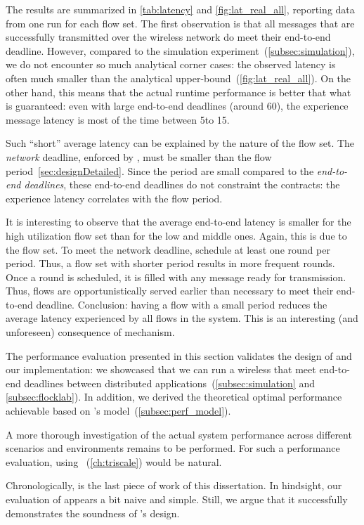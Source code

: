 The results are summarized in \cref{tab:latency} and \cref{fig:lat_real_all}, reporting data from one run for each flow set.
The first observation is that all messages that are successfully transmitted over the wireless network do meet their end-to-end deadline.
However, compared to the simulation experiment~(\cref{subsec:simulation}), we do not encounter so much analytical corner cases: the observed latency is often much smaller than the analytical upper-bound~(\cref{fig:lat_real_all}).
On the other hand, this means that the actual runtime performance is better that what is guaranteed: even with large end-to-end deadlines (around 60\s), the experience message latency is most of the time between 5\s to 15\s.

Such ``short'' average latency can be explained by the nature of the flow set. The \emph{network} deadline, enforced by \blink, must be smaller than the flow period~\cref{sec:designDetailed}. Since the period are small compared to the \emph{end-to-end deadlines}, these end-to-end deadlines do not constraint the \DRP contracts: the experience latency correlates with the flow period.

It is interesting to observe that the average end-to-end latency is smaller for the high utilization flow set than for the low and middle ones. Again, this is due to the flow set. To meet the network deadline, \blink schedule at least one round per period. Thus, a flow set with shorter period results in more frequent rounds. Once a round is scheduled, it is filled with any message ready for transmission. Thus, flows are opportunistically served earlier than necessary to meet their end-to-end deadline. Conclusion: having a flow with a small period reduces the average latency experienced by all flows in the system. This is an interesting (and unforeseen) consequence of \DRP mechanism.

The performance evaluation presented in this section validates the design of \DRP and our implementation: we showcased that we can run a wireless \CPS that meet end-to-end deadlines between distributed applications~(\cref{subsec:simulation} and \ref{subsec:flocklab}).
In addition, we derived the theoretical optimal performance achievable based on \DRP's model~(\cref{subsec:perf_model}).

A more thorough investigation of the actual system performance across different scenarios and environments remains to be performed.
For such a performance evaluation, using \triscale~(\cref{ch:triscale}) would be natural.

Chronologically, \triscale is the last piece of work of this dissertation. In hindsight, our evaluation of \DRP appears a bit naive and simple. Still, we argue that it successfully demonstrates the soundness of \DRP's design.%
